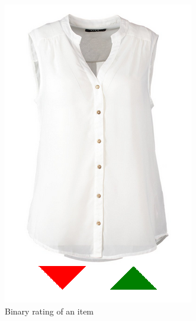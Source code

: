 \begin{figure}[h]
    \center
    \includegraphics[scale=0.3]{inc/implementation/onlineshop/recommender-onlineshop-binary_rating}
    \caption{Binary rating of an item}
    \label{fig:onlineshop-explicit-rating}
\end{figure}

